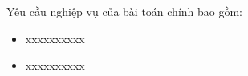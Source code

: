 Yêu cầu nghiệp vụ của bài toán chính  bao gồm:

\begin{itemize}

    \item xxxxxxxxxx
    
    \item xxxxxxxxxx
    
    \end{itemize}
    
    































